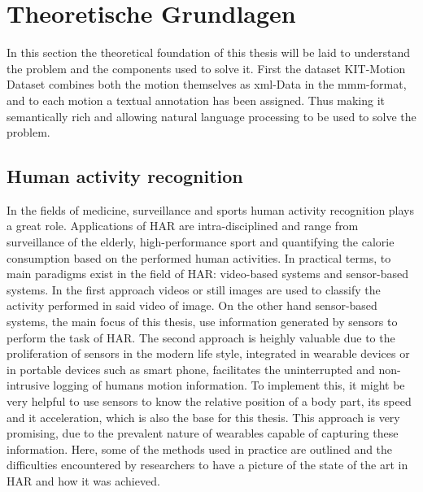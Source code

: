 \chapter{Theoretische Grundlagen}
In this section the theoretical foundation of this thesis will be laid to understand the problem and the components used to solve it. First the dataset KIT-Motion Dataset combines both the motion themselves as xml-Data in the mmm-format, and to each motion a textual annotation has been assigned. Thus making it semantically rich and allowing natural language processing to be used to solve the problem.
\section{Human activity recognition}\label{sec:HAR}
In the fields of medicine, surveillance and sports human activity recognition plays a great role. Applications of HAR are intra-disciplined and range from surveillance of the elderly, high-performance sport and quantifying the calorie consumption based on the performed human activities. In practical terms, to main paradigms exist in the field of HAR: video-based systems and sensor-based systems\cite{chen2021deep}. In the first approach videos or still images are used to classify the activity performed in said video of image. On the other hand sensor-based systems, the main focus of this thesis, use information generated by sensors to perform the task of HAR. The second approach is heighly valuable due to the proliferation of sensors in the modern life style, integrated in wearable devices or in portable devices such as smart phone, facilitates the uninterrupted and non-intrusive logging of humans motion information\cite{chen2021deep}.\newline
To implement this, it might be very helpful to use sensors to know the relative position of a body part, its speed and it acceleration, which is also the base for this thesis. This approach is very promising, due to the prevalent nature of wearables capable of capturing these information. Here, some of the methods used in practice are outlined and the difficulties encountered by researchers to have a picture of the state of the art in HAR and how it was achieved.\newline
